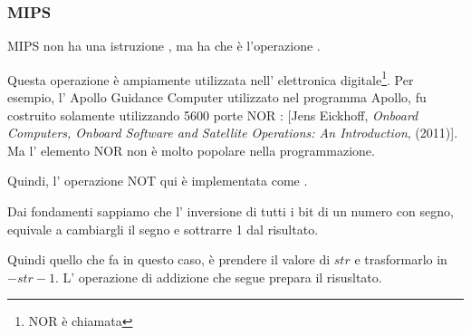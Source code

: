 ﻿\subsubsection{MIPS}




MIPS non ha una istruzione \NOT, ma ha \NOR che è l'operazione .


Questa operazione è ampiamente utilizzata nell' elettronica digitale\footnote{NOR è chiamata }.
Per esempio, l' Apollo Guidance Computer utilizzato nel programma Apollo, 
fu costruito solamente utilizzando 5600 porte NOR :
[Jens Eickhoff, \emph{Onboard Computers, Onboard Software and Satellite Operations: An Introduction}, (2011)].
Ma l' elemento NOR non è molto popolare nella programmazione.

Quindi, l' operazione NOT qui è implementata come .

Dai fondamenti  sappiamo che l' inversione di tutti i bit di un numero con segno, equivale 
a cambiargli il segno e sottrarre 1 dal risultato.

Quindi quello che \NOT fa in questo caso, è prendere il valore di $str$ e trasformarlo in $-str-1$.
L' operazione di addizione che segue prepara il risusltato.
